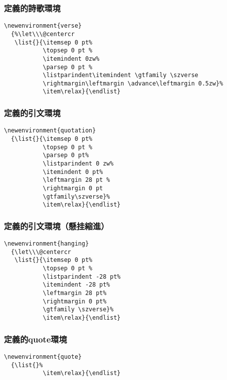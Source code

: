 \subsubsection{定義的詩歌環境}

\begin{lstlisting}[firstnumber=1195]
\newenvironment{verse}
  {%\let\\\@centercr
   \list{}{\itemsep 0 pt%
           \topsep 0 pt %
           \itemindent 0zw%
           \parsep 0 pt %
           \listparindent\itemindent \gtfamily \szverse
           \rightmargin\leftmargin \advance\leftmargin 0.5zw}%
           \item\relax}{\endlist}
\end{lstlisting}

\subsubsection{定義的引文環境}

\begin{lstlisting}[firstnumber=1205]
\newenvironment{quotation}
  {\list{}{\itemsep 0 pt%
           \topsep 0 pt %
           \parsep 0 pt%
           \listparindent 0 zw%
           \itemindent 0 pt%
           \leftmargin 28 pt %
           \rightmargin 0 pt
           \gtfamily\szverse}%
           \item\relax}{\endlist}
\end{lstlisting}

\subsubsection{定義的引文環境（懸挂縮進）}

\begin{lstlisting}[firstnumber=1217]
\newenvironment{hanging}
  {\let\\\@centercr
   \list{}{\itemsep 0 pt%
           \topsep 0 pt %
           \listparindent -28 pt%
           \itemindent -28 pt%
           \leftmargin 28 pt%
           \rightmargin 0 pt%
           \gtfamily \szverse}%
           \item\relax}{\endlist}
\end{lstlisting}

\subsubsection{定義的quote環境}

\begin{lstlisting}[firstnumber=1228]
\newenvironment{quote}
  {\list{}%
           \item\relax}{\endlist}
\end{lstlisting}

